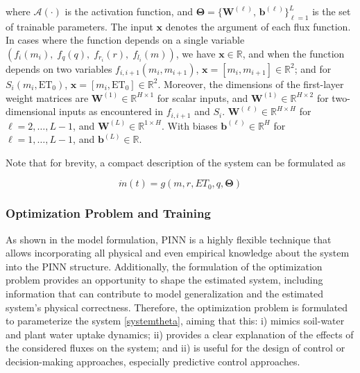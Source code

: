 \documentclass[pdflatex,sn-nature]{sn-jnl}%
\theoremstyle{thmstyleone}%
\theoremstyle{thmstyletwo}%
\theoremstyle{thmstylethree}%
\begin{document}
where \(\mathcal{A}(\cdot)\) is the activation function, and  
\(\displaystyle \boldsymbol{\Theta} = \{\mathbf{W}^{(\ell)},\,\mathbf{b}^{(\ell)}\}_{\ell=1}^L\) is the set of trainable parameters. The input \(\mathbf{x}\) denotes the argument of each flux function.  
In cases where the function depends on a single variable $\left(f_i(m_i),\;f_q(q),\;f_{r_i}(r),\;f_{l_i}(m)\right)$, we have \(\mathbf{x}\in\mathbb{R}\), and when the function depends on two variables \(f_{i,i+1}(m_i,m_{i+1})\),  
\(\displaystyle \mathbf{x}=[m_i,m_{i+1}]\in\mathbb{R}^2\); and for \(S_i(m_i,\mathrm{ET_0})\),  
\(\displaystyle \mathbf{x}=[m_i,\mathrm{ET_0}]\in\mathbb{R}^2\).  Moreover, the dimensions of the first-layer weight matrices are  
\(\mathbf{W}^{(1)}\in\mathbb{R}^{H\times1}\) for scalar inputs, and  
\(\mathbf{W}^{(1)}\in\mathbb{R}^{H\times2}\) for two-dimensional inputs as encountered in \(f_{i,i+1}\) and \(S_i\).
\( \mathbf{W}^{(\ell)} \in \mathbb{R}^{H \times H} \) for \( \ell = 2, \dots, L-1 \), and \( \mathbf{W}^{(L)} \in \mathbb{R}^{1 \times H} \). With biases \( \mathbf{b}^{(\ell)} \in \mathbb{R}^{H} \) for \( \ell = 1, \dots, L-1 \), and \( \mathbf{b}^{(L)} \in \mathbb{R} \).

Note that for brevity, a compact description of the system can be formulated as 

\begin{equation}
    \label{systemtheta}
    \dot{m}(t) = g(m,r,ET_0,q,\boldsymbol{\Theta})
\end{equation}


\subsubsection{Optimization Problem and Training}\label{subsec2}

As shown in the model formulation, PINN is a highly flexible technique that allows incorporating all physical and even empirical knowledge about the system into the PINN structure. Additionally, the formulation of the optimization problem provides an opportunity to shape the estimated system, including information that can contribute to model generalization and the estimated system's physical correctness. Therefore, the optimization problem is formulated to parameterize the system \ref{systemtheta}, aiming that this: i) mimics soil-water and plant water uptake dynamics; ii) provides a clear explanation of the effects of the considered fluxes on the system; and ii) is useful for the design of control or decision-making approaches, especially predictive control approaches.
\end{document}
